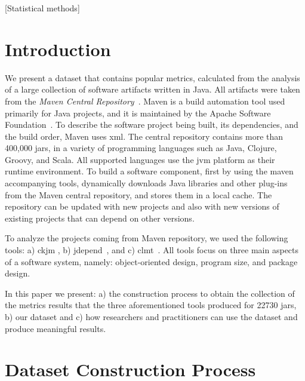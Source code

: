\documentclass{sig-alternate}
\begin{document}
[Statistical methods]



\section{Introduction}
\label{sec:intro}

We present a dataset that contains popular metrics, calculated from the analysis of a large collection of software artifacts written in Java. All artifacts were taken from the {\it Maven Central Repository}~\cite{MAVEN}. Maven is a build automation tool used primarily for Java projects, and it is maintained by the Apache Software Foundation~\cite{MAVEN}. To describe the software project being built, its dependencies, and the build order, Maven uses {\sc xml}. The central repository contains more than 400,000 {\sc jar}s, in a variety of programming languages such as Java, Clojure, Groovy, and Scala. All supported languages use the {\sc jvm} platform as their runtime environment. To build a software component, first by using the maven accompanying tools, dynamically downloads Java libraries and other plug-ins from the Maven central repository, and stores them in a local cache. The repository can be updated with new projects and also with new versions of existing projects that can depend on other versions.

To analyze the projects coming from Maven repository, we used the following tools: a) {\sc ckjm} \cite{Spi05g}, b) {\sc jd}epend~\cite{JDEPEND}, and c) {\sc clmt}~\cite{SGKL09}. All tools focus on three main aspects of a software system, namely: object-oriented design, program size, and package design.

In this paper we present: a) the construction process to obtain the collection of the metrics results that the three aforementioned tools produced for 22730 {\sc jar}s, b) our dataset and c) how researchers and practitioners can use the dataset and produce meaningful results.

\section{Dataset Construction Process}
\label{sec:data}
\end{document}

